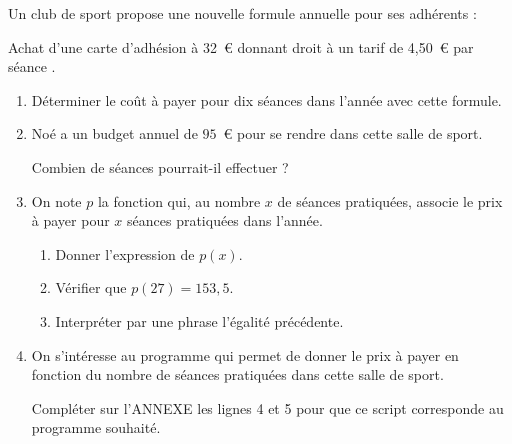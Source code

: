 \documentclass[exercice,a4]{thedocument}%
\begin{document}
%

\medskip

Un club de sport propose une nouvelle formule annuelle pour ses adhérents :

\og Achat d'une carte d'adhésion à 32~\euro{} donnant droit à un tarif de 4,50~\euro{} par séance \fg.

\medskip

\begin{enumerate}
\item Déterminer le coût à payer pour dix séances dans l'année avec cette formule.
\item Noé a un budget annuel de $95$~\euro{} pour se rendre dans cette salle de sport.

Combien de séances pourrait-il effectuer ?
\item On note $p$ la fonction qui, au nombre $x$ de séances pratiquées, associe le prix à payer pour $x$ séances pratiquées dans l'année.
	\begin{enumerate}
		\item Donner l'expression de $p(x)$.
		\item Vérifier que $p(27) = 153,5$.
		\item Interpréter par une phrase l'égalité précédente.
\end{enumerate}
\item On s'intéresse au programme qui permet de donner le prix à payer en fonction du nombre de séances pratiquées dans cette salle de sport.

\begin{center}
\begin{scratch}
\end{scratch}
\end{center}

Compléter sur l'ANNEXE  les lignes 4 et 5 pour que ce script corresponde au programme souhaité.
\end{enumerate}
\end{document}
